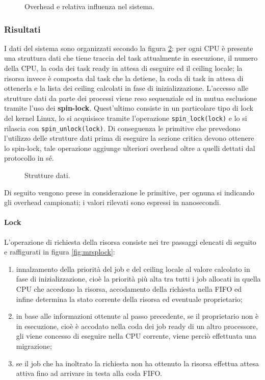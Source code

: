 \begin{figure}
\centering
{}
\caption{Overhead e relativa influenza nel sistema.}
\label{fig:overheads_suffered}
\end{figure}

\subsubsection{Risultati}
\label{sec:overhead_ris}

\noindent I dati del sistema sono organizzati secondo la figura \ref{fig:datas}: per ogni CPU è presente una struttura dati che tiene traccia del task attualmente in esecuzione, il numero della CPU, la coda dei task ready in attesa di eseguire ed il ceiling locale; la risorsa invece è composta dal task che la detiene, la coda di task in attesa di ottenerla e la lista dei ceiling calcolati in fase di inizializzazione. L'accesso alle strutture dati da parte dei processi viene reso sequenziale ed in mutua esclusione tramite l'uso dei \textbf{spin-lock}. Quest'ultimo consiste in un particolare tipo di lock del kernel Linux, lo si acquisisce tramite l'operazione \texttt{spin\_lock(lock)} e lo si rilascia con \texttt{spin\_unlock(lock)}. Di conseguenza le primitive che prevedono l'utilizzo delle strutture dati prima di eseguire la sezione critica devono ottenere lo spin-lock, tale operazione aggiunge ulteriori overhead oltre a quelli dettati dal protocollo in sé.\\

\begin{figure}
\centering
{}
\caption{Strutture dati.}
\label{fig:datas}
\end{figure}


\noindent Di seguito vengono prese in considerazione le primitive, per ognuna si indicando gli overhead campionati; i valori rilevati sono espressi in nanosecondi.

\paragraph{Lock}  L'operazione di richiesta della risorsa consiste nei tre passaggi elencati di seguito e raffigurati in figura \ref{fig:mrsplock}:

\begin{enumerate}
	\item innalzamento della priorità del job e del ceiling locale al valore calcolato in fase di inizializzazione, cioè la priorità più alta tra tutti i job allocati in quella CPU che accedono la risorsa, accodamento della richiesta nella FIFO ed infine determina la stato corrente della risorsa ed eventuale proprietario;
	\item in base alle informazioni ottenute al passo precedente, se il proprietario non è in esecuzione, cioè è accodato nella coda dei job ready di un altro processore, gli viene concesso di eseguire nella CPU corrente, viene perciò effettuata una migrazione;
	\item se il job che ha inoltrato la richiesta non ha ottenuto la risorsa effettua attesa attiva fino ad arrivare in testa alla coda FIFO.
\end{enumerate}

